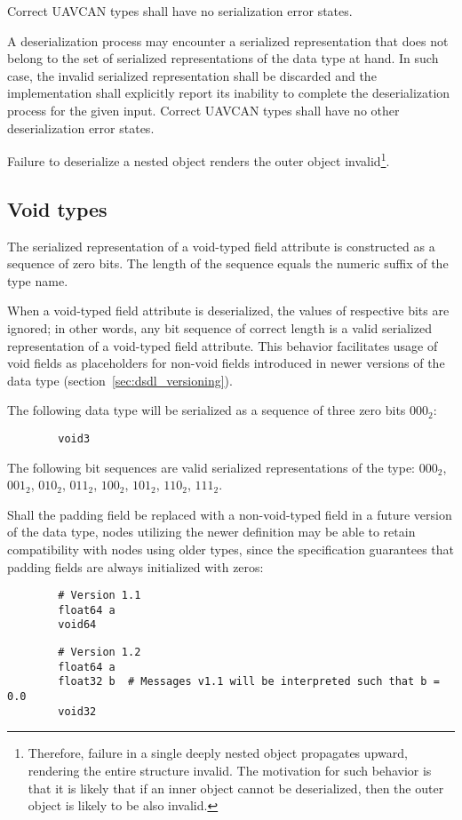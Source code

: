 Correct UAVCAN types shall have no serialization error states.

A deserialization process may encounter a serialized representation that does not belong to the
set of serialized representations of the data type at hand.
In such case, the invalid serialized representation shall be discarded and the implementation
shall explicitly report its inability to complete the deserialization process for the given input.
Correct UAVCAN types shall have no other deserialization error states.

Failure to deserialize a nested object renders the outer object invalid\footnote{%
    Therefore, failure in a single deeply nested object propagates upward, rendering the entire structure invalid.
    The motivation for such behavior is that it is likely that if an inner object cannot be deserialized,
    then the outer object is likely to be also invalid.
}.

\subsection{Void types}\label{sec:dsdl_serialized_void}

The serialized representation of a void-typed field attribute is constructed as a sequence of zero bits.
The length of the sequence equals the numeric suffix of the type name.

When a void-typed field attribute is deserialized, the values of respective bits are ignored;
in other words, any bit sequence of correct length is a valid serialized representation
of a void-typed field attribute.
This behavior facilitates usage of void fields as placeholders for non-void fields
introduced in newer versions of the data type (section~\ref{sec:dsdl_versioning}).

\begin{remark}
    The following data type will be serialized as a sequence of three zero bits $000_2$:
    \begin{verbatim}
        void3
    \end{verbatim}
    The following bit sequences are valid serialized representations of the type:
    $000_2$,
    $001_2$,
    $010_2$,
    $011_2$,
    $100_2$,
    $101_2$,
    $110_2$,
    $111_2$.

    Shall the padding field be replaced with a non-void-typed field in a future version of the data type,
    nodes utilizing the newer definition may be able to retain compatibility with nodes using older types,
    since the specification guarantees that padding fields are always initialized with zeros:

    \begin{verbatim}
        # Version 1.1
        float64 a
        void64
    \end{verbatim}

    \begin{verbatim}
        # Version 1.2
        float64 a
        float32 b  # Messages v1.1 will be interpreted such that b = 0.0
        void32
    \end{verbatim}
\end{remark}

